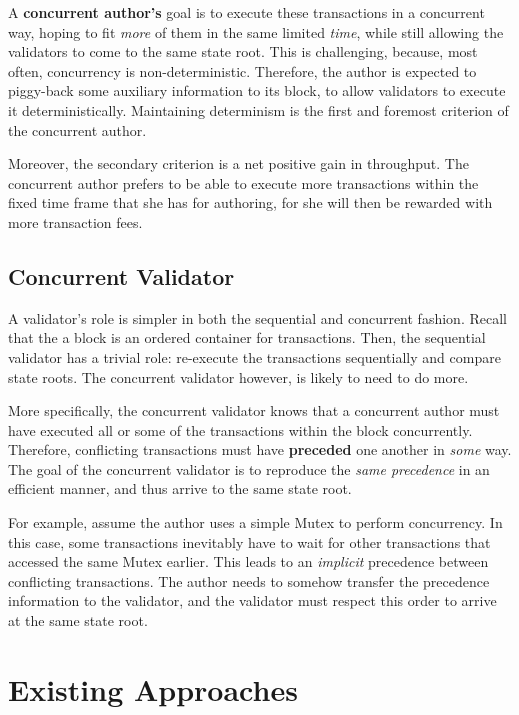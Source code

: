 A \textbf{concurrent author's} goal is to execute these transactions in a concurrent way, hoping to
fit \textit{more} of them in the same limited \textit{time}, while still allowing the validators to
come to the same state root. This is challenging, because, most often, concurrency is
non-deterministic. Therefore, the author is expected to piggy-back some auxiliary information to its
block, to allow validators to execute it deterministically. Maintaining determinism is the first and
foremost criterion of the concurrent author.

Moreover, the secondary criterion is a net positive gain in throughput. The concurrent author
prefers to be able to execute more transactions within the fixed time frame that she has for
authoring, for she will then be rewarded with more transaction fees.

\subsection{Concurrent Validator} \label{chap_appraoch:subsec:concurrent_validator}

A validator's role is simpler in both the sequential and concurrent fashion. Recall that the a block
is an ordered container for transactions. Then, the sequential validator has a trivial role:
re-execute the transactions sequentially and compare state roots. The concurrent validator however,
is likely to need to do more.

More specifically, the concurrent validator knows that a concurrent author must have executed all or
some of the transactions within the block concurrently. Therefore, conflicting transactions must
have \textbf{preceded} one another in \textit{some} way. The goal of the concurrent validator is to
reproduce the \textit{same precedence} in an efficient manner, and thus arrive to the same state
root.

For example, assume the author uses a simple Mutex to perform concurrency. In this case, some
transactions inevitably have to wait for other transactions that accessed the same Mutex earlier.
This leads to an \textit{implicit} precedence between conflicting transactions. The author needs to
somehow transfer the precedence information to the validator, and the validator must respect this
order to arrive at the same state root.

\section{Existing Approaches}\label{chap_approach:existing}

